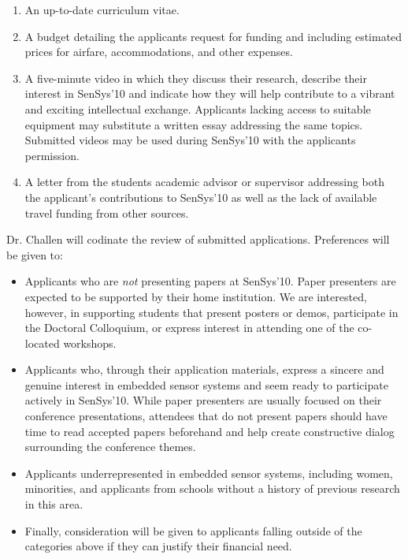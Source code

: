 \begin{enumerate}

\item An up-to-date curriculum vitae.

\item A budget detailing the applicants request for funding and including
estimated prices for airfare, accommodations, and other expenses.

\item A five-minute video in which they discuss their research, describe
their interest in SenSys'10 and indicate how they will help contribute to a
vibrant and exciting intellectual exchange. Applicants lacking access to
suitable equipment may substitute a written essay addressing the same topics.
Submitted videos may be used during SenSys'10 with the applicants permission.

\item A letter from the students academic advisor or supervisor addressing
both the applicant's contributions to SenSys'10 as well as the lack of
available travel funding from other sources.

\end{enumerate}

Dr. Challen will codinate the review of submitted applications.
Preferences will be given to:

\begin{itemize}

\item Applicants who are \textit{not} presenting papers at SenSys'10. Paper
presenters are expected to be supported by their home institution. We are
interested, however, in supporting students that present posters or demos,
participate in the Doctoral Colloquium, or express interest in attending one
of the co-located workshops.

\item Applicants who, through their application materials, express a sincere
and genuine interest in embedded sensor systems and seem ready to participate
actively in SenSys'10. While paper presenters are usually focused on their
conference presentations, attendees that do not present papers should have
time to read accepted papers beforehand and help create constructive dialog
surrounding the conference themes.

\item Applicants underrepresented in embedded sensor systems, including
women, minorities, and applicants from schools without a history of previous
research in this area.

\item Finally, consideration will be given to applicants falling outside of
the categories above if they can justify their financial need.

\end{itemize}

